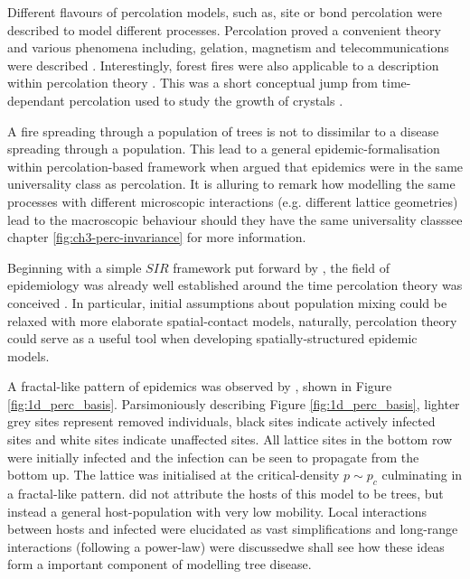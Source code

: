 Different flavours of percolation models, such as, site or bond percolation were described to model different processes. Percolation proved a convenient theory and various phenomena including, gelation, magnetism and telecommunications were described \cite{trove.nla.gov.au/work/26493727}. Interestingly, forest fires were also applicable to a description within percolation theory \cite{MacKay_1984}. This was a short conceptual jump from time-dependant percolation used to study the growth of crystals \cite{Family_1985}. 

A fire spreading through a population of trees is not to dissimilar to a disease spreading through a population. This lead to a general epidemic-formalisation within percolation-based framework when \cite{pub.1059067807} argued that epidemics were in the same universality class as percolation. It is alluring to remark how modelling the same processes with different microscopic interactions (e.g. different lattice geometries) lead to the macroscopic behaviour should they have the same universality class\textemdash see chapter \ref{fig:ch3-perc-invariance} for more information.

Beginning with a simple $SIR$ framework put forward by \cite{kermack-model}, the field of epidemiology was already well established around the time percolation theory was conceived \cite{baily1975mathematical}. In particular, initial assumptions about population mixing could be relaxed with more elaborate spatial-contact models, naturally, percolation theory could serve as a useful tool when developing spatially-structured epidemic models.

A fractal-like pattern of epidemics was observed by \cite{GRASSBERGER1986273}, shown in Figure \ref{fig:1d_perc_basis}. Parsimoniously describing Figure \ref{fig:1d_perc_basis}, lighter grey sites represent removed individuals, black sites indicate actively infected sites and white sites indicate unaffected sites. All lattice sites in the bottom row were initially infected and the infection can be seen to propagate from the bottom up. The lattice was initialised at the critical-density $p\sim p_c$ culminating in a fractal-like pattern. \cite{GRASSBERGER1986273} did not attribute the hosts of this model to be trees, but instead a general host-population with very low mobility. Local interactions between hosts and infected were elucidated as vast simplifications and long-range interactions (following a power-law) were discussed\textemdash we shall see how these ideas form a important component of modelling tree disease.

